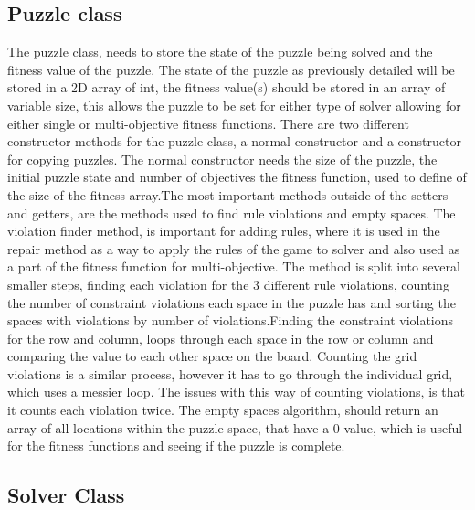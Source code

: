 \documentclass[a4paper,11pt]{article}
\begin{document}
\subsection{Puzzle class}
The puzzle class, needs to store the state of the puzzle being solved and the fitness value of the puzzle. The state of the puzzle as previously detailed will be stored in a 2D array of int, the fitness value(s) should be stored in an array of variable size, this allows the puzzle to be set for either type of solver allowing for either single or multi-objective fitness functions. There are two different constructor methods for the puzzle class, a normal constructor and a constructor for copying puzzles. The normal constructor needs the size of the puzzle, the initial puzzle state and number of objectives the fitness function, used to define of the size of the fitness array.\newline \newline The most important methods outside of the setters and getters, are the methods used to find rule violations and empty spaces. The violation finder method, is important for adding rules, where it is used in the repair method as a way to apply the rules of the game to solver and also used as a part of the fitness function for multi-objective. The method is split into several smaller steps, finding each violation for the 3 different rule violations, counting the number of constraint violations each space in the puzzle has and sorting the spaces with violations by number of violations.\newline \newline Finding the constraint violations for the row and column, loops through each space in the row or column and comparing the value to each other space on the board. Counting the grid violations is a similar process, however it has to go through the individual grid, which uses a messier loop. The issues with this way of counting violations, is that it counts each violation twice. The empty spaces algorithm, should return an array of all locations within the puzzle space, that have a 0 value, which is useful for the fitness functions and seeing if the puzzle is complete.

\subsection{Solver Class}
\end{document}
